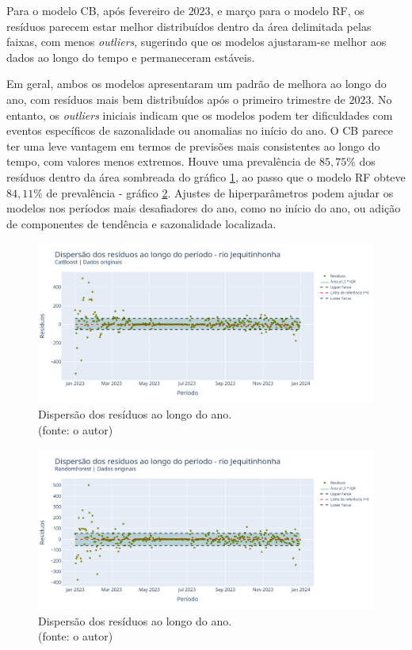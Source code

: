 Para o modelo CB, após fevereiro de $2023$, e março para o modelo RF, os resíduos parecem estar melhor distribuídos dentro da área delimitada pelas faixas, com menos \textit{outliers}, sugerindo que os modelos ajustaram-se melhor aos dados ao longo do tempo e permaneceram estáveis.

Em geral, ambos os modelos apresentaram um padrão de melhora ao longo do ano, com resíduos mais bem distribuídos após o primeiro trimestre de $2023$. No entanto, os \textit{outliers} iniciais indicam que os modelos podem ter dificuldades com eventos específicos de sazonalidade ou anomalias no início do ano. O CB parece ter uma leve vantagem em termos de previsões mais consistentes ao longo do tempo, com valores menos extremos. Houve uma prevalência de $85,75\%$ dos resíduos dentro da área sombreada do gráfico \ref{fig:jequiti_CB_WFV_ORIG_RESID_x_TEMPO}, ao passo que o modelo RF obteve $84,11\%$ de prevalência - gráfico \ref{fig:jequiti_RF_WFV_ORIG_RESID_x_TEMPO}. Ajustes de hiperparâmetros podem ajudar os modelos nos períodos mais desafiadores do ano, como no início do ano, ou adição de componentes de tendência e sazonalidade localizada.

\begin{figure}[!h]
	\centering
	\includegraphics[scale=0.33]{Figuras/jequiti/wfv/CB/CB_WFV_ORIG_RESID_x_TEMPO.png}
	\caption{Dispersão dos resíduos ao longo do ano.\\(fonte: o autor)}
	\label{fig:jequiti_CB_WFV_ORIG_RESID_x_TEMPO}
\end{figure}

\begin{figure}[!h]
	\centering
	\includegraphics[scale=0.33]{Figuras/jequiti/wfv/RF/RF_WFV_ORIG_RESID_x_TEMPO.png}
	\caption{Dispersão dos resíduos ao longo do ano.\\(fonte: o autor)}
	\label{fig:jequiti_RF_WFV_ORIG_RESID_x_TEMPO}
\end{figure}
\clearpage

